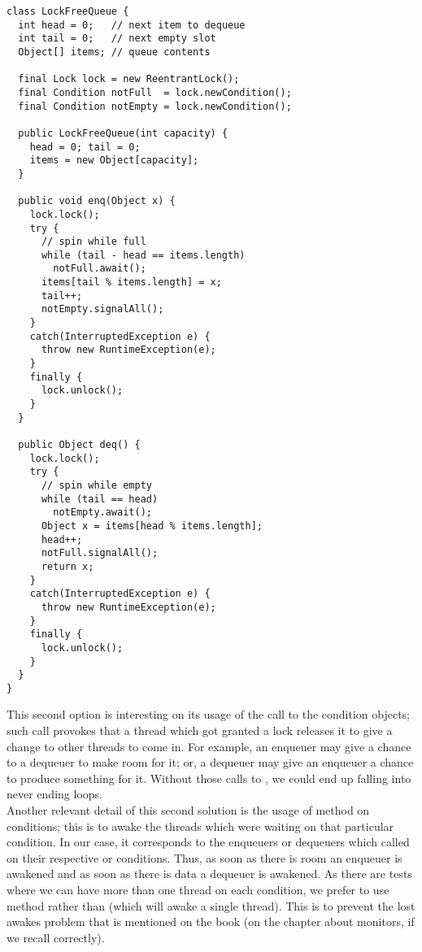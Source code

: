 \begin{lstlisting}[style=nonumbers]
class LockFreeQueue {
  int head = 0;   // next item to dequeue
  int tail = 0;   // next empty slot
  Object[] items; // queue contents

  final Lock lock = new ReentrantLock();
  final Condition notFull  = lock.newCondition(); 
  final Condition notEmpty = lock.newCondition(); 

  public LockFreeQueue(int capacity) {
    head = 0; tail = 0;
    items = new Object[capacity];
  }

  public void enq(Object x) {
    lock.lock();
    try {
      // spin while full
      while (tail - head == items.length) 
        notFull.await();
      items[tail % items.length] = x;
      tail++;
      notEmpty.signalAll();
    }
    catch(InterruptedException e) {
      throw new RuntimeException(e);
    }
    finally {
      lock.unlock();
    }
  }

  public Object deq() {
    lock.lock();
    try {
      // spin while empty
      while (tail == head)
        notEmpty.await();
      Object x = items[head % items.length];
      head++;
      notFull.signalAll();
      return x;
    }
    catch(InterruptedException e) {
      throw new RuntimeException(e);
    }
    finally {
      lock.unlock();
    }
  }
}  
\end{lstlisting}
\hfill

This second option is interesting on its usage of the  call
to the condition objects; such call provokes that a thread which got
granted a lock releases it to give a change to other threads to come
in. For example, an enqueuer may give a chance to a dequeuer to make
room for it; or, a dequeuer may give an enqueuer a chance to produce
something for it. Without those calls to , we could end up
falling into never ending loops. \\

Another relevant detail of this second solution is the usage of
  method on conditions; this is to awake the threads
which were waiting on that particular condition. In our 
case, it corresponds to the enqueuers or dequeuers which
called  on their respective  or 
conditions. Thus, as soon as there is room an enqueuer is awakened
and as soon as there is data a dequeuer is awakened. As there are
tests where we can have more than one thread on each condition, we
prefer to use  method rather than  (which will
awake a single thread). This is to prevent the lost awakes problem
that is mentioned on the book (on the chapter about monitors, if we
recall correctly).



